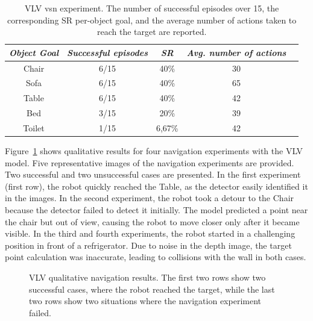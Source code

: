 \begin{table}[t]
\centering
\begin{tabular}{c|cccc}
\toprule
\textit{\textbf{Object Goal}} & \textit{\textbf{Successful episodes}} & \textit{\textbf{SR}} &  \textit{\textbf{Avg. number of actions}}   \\ \midrule
Chair                & 6/15     & 40\%   &   30  \\
Sofa                 & 6/15     & 40\%   &   65  \\
Table                & 6/15     & 40\%   &   42  \\
Bed                  & 3/15     & 20\%   &   39  \\
Toilet               & 1/15     & 6,67\%    &   42  \\ \bottomrule
\end{tabular}
\caption{VLV \acrshort{vsn} experiment. The number of successful episodes over 15, the corresponding SR per-object goal, and the average number of actions taken to reach the target are reported.}
\label{tab:vlv}
\end{table}

Figure~\ref{fig:vlv_qualitative} shows qualitative results for four navigation experiments with the VLV model.
Five representative images of the navigation experiments are provided.
Two successful and two unsuccessful cases are presented.
In the first experiment (first row), the robot quickly reached the Table, as the detector easily identified it in the images.
In the second experiment, the robot took a detour to the Chair because the detector failed to detect it initially.
The model predicted a point near the chair but out of view, causing the robot to move closer only after it became visible.
In the third and fourth experiments, the robot started in a challenging position in front of a refrigerator.
Due to noise in the depth image, the target point calculation was inaccurate, leading to collisions with the wall in both cases.

\begin{figure}[t]
    \centering
        \caption{VLV qualitative navigation results. The first two rows show two successful cases, where the robot reached the target, while the last two rows show two situations where the navigation experiment failed.}
        \label{fig:vlv_qualitative}
\end{figure}

